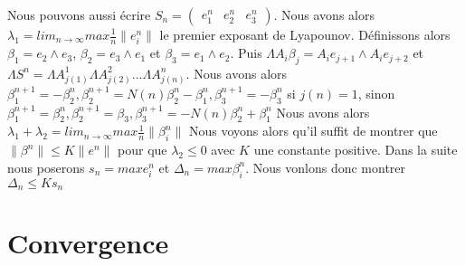 \documentclass[12pt]{article}
\theoremstyle{plain}%
\theoremstyle{definition}
\theoremstyle{remark}
\begin{document}
Nous pouvons aussi écrire $S_n=\begin{pmatrix} e_1^n & e_2^n & e_3^n\end{pmatrix}$.
 Nous avons alors $\lambda_1= lim_{n\to \infty} max \frac{1}{n}\|e_i^n\|$ le premier exposant de Lyapounov.\newline
 Définissons alors $\beta_1=e_2 \land e_3$, $\beta_2=e_3 \land e_1$ et $\beta_3=e_1 \land e_2$.
 Puis $\Lambda A_i \beta_j=A_i e_{j+1} \land A_i e_{j+2}$ et $\Lambda S^n=\Lambda A_{j(1)}^1  \Lambda A_{j(2)}^2 ... \Lambda A_{j(n)}^n$. \newline
 Nous avons alors $\beta_1^{n+1}=-\beta_2^{n},\beta_2^{n+1}=N(n) \beta_2^n-\beta_1^n,\beta_3^{n+1}=-\beta_3^n$
  si $j(n)=1$, sinon $\beta_1^{n+1}=\beta_2^{n},\beta_2^{n+1}=\beta_3,\beta_3^{n+1}=-N(n) \beta_2^n+\beta_1^n $
  Nous avons alors $\lambda_1 + \lambda_2= lim_{n\to \infty} max \frac{1}{n}\|\beta_i^n\|$ \newline
  Nous voyons alors qu'il suffit de montrer que $\|\beta^n\| \leq K \|e^n\|$ pour que $\lambda_2 \leq 0$ avec $K$ une constante positive. \newline
  Dans la suite nous poserons $s_n= max e_i^n$ et $\Delta_n=max \beta_i^n$. Nous vonlons donc montrer $\Delta_n \leq K s_n$
\section{Convergence}
\end{document}
